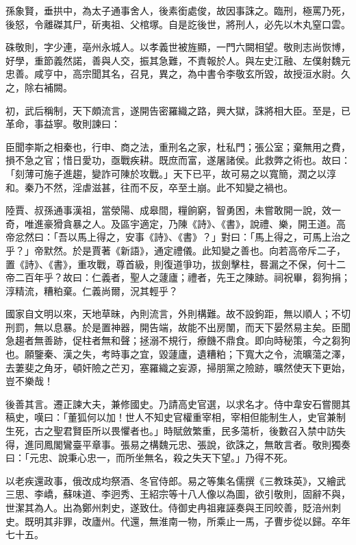\begin{pinyinscope}
 孫象賢，垂拱中，為太子通事舍人，後素銜處俊，故因事誅之。臨刑，極罵乃死，後怒，令離磔其尸，斫夷祖、父棺塚。自是訖後世，將刑人，必先以木丸窒口雲。



 硃敬則，字少連，亳州永城人。以孝義世被旌顯，一門六闕相望。敬則志尚恢博，好學，重節義然諾，善與人交，振其急難，不責報於人。與左史江融、左僕射魏元忠善。咸亨中，高宗聞其名，召見，異之，為中書令李敬玄所毀，故授洹水尉。久之，除右補闕。



 初，武后稱制，天下頗流言，遂開告密羅織之路，興大獄，誅將相大臣。至是，已革命，事益寧。敬則諫曰：



 臣聞李斯之相秦也，行申、商之法，重刑名之家，杜私門；張公室；棄無用之費，損不急之官；惜日愛功，亟戰疾耕。既庶而富，遂屠諸侯。此救弊之術也。故曰：「刻薄可施子進趨，變詐可陳於攻戰。」天下已平，故可易之以寬簡，潤之以淳和。秦乃不然，淫虐滋甚，往而不反，卒至土崩。此不知變之禍也。



 陸賈、叔孫通事漢祖，當滎陽、成皋間，糧餉窮，智勇困，未嘗敢開一說，效一奇，唯進豪猾貪暴之人。及區宇適定，乃陳《詩》、《書》，說禮、樂，開王道。高帝忿然曰：「吾以馬上得之，安事《詩》、《書》？」對曰：「馬上得之，可馬上治之乎？」帝默然。於是賈著《新語》，通定禮儀。此知變之善也。向若高帝斥二子，置《詩》、《書》，重攻戰，尊首級，則復道爭功，拔劍擊柱，晷漏之不保，何十二帝二百年乎？故曰：仁義者，聖人之蘧廬；禮者，先王之陳跡。祠祝畢，芻狗捐；淳精流，糟粕棄。仁義尚爾，況其輕乎？



 國家自文明以來，天地草昧，內則流言，外則構難。故不設鉤距，無以順人；不切刑罰，無以息暴。於是置神器，開告端，故能不出房闈，而天下晏然易主矣。臣聞急趨者無善跡，促柱者無和聲；拯溺不規行，療饑不鼎食。即向時秘策，今之芻狗也。願鑒秦、漢之失，考時事之宜，毀蘧廬，遺糟粕；下寬大之令，流曠蕩之澤，去萋斐之角牙，頓奸險之芒刃，塞羅織之妄源，掃朋黨之險跡，曠然使天下更始，豈不樂哉！



 後善其言。遷正諫大夫，兼修國史。乃請高史官選，以求名才。侍中韋安石嘗閱其稿史，嘆曰：「董狐何以加！世人不知史官權重宰相，宰相但能制生人，史官兼制生死，古之聖君賢臣所以畏懼者也。」時賦斂繁重，民多蕩析，後數召入禁中訪失得，進同鳳閣鸞臺平章事。張易之構魏元忠、張說，欲誅之，無敢言者。敬則獨奏曰：「元忠、說秉心忠一，而所坐無名，殺之失天下望。」乃得不死。



 以老疾還政事，俄改成均祭酒、冬官侍郎。易之等集名儒撰《三教珠英》，又繪武三思、李嶠，蘇味道、李迥秀、王紹宗等十八人像以為圖，欲引敬則，固辭不與，世潔其為人。出為鄭州刺史，遂致仕。侍御史冉祖雍誣奏與王同皎善，貶涪州刺史。既明其非罪，改廬州。代還，無淮南一物，所乘止一馬，子曹步從以歸。卒年七十五。




\end{pinyinscope}
